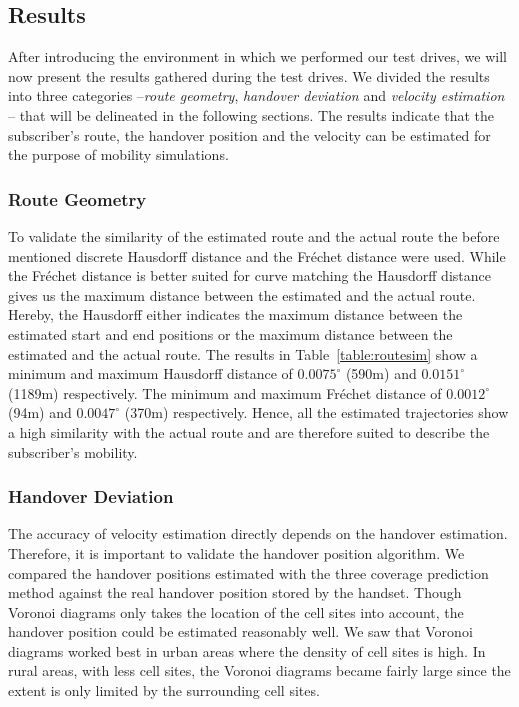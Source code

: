 \subsection{Results}
After introducing the environment in which we performed our test drives, we will now present the results gathered during the test drives. We divided the results into three categories --\emph{route geometry}, \emph{handover deviation} and \emph{velocity estimation} -- that will be delineated in the following sections. The results indicate that the subscriber's route, the handover position and the velocity can be estimated for the purpose of mobility simulations.
\subsubsection{Route Geometry}
To validate the similarity of the estimated route and the actual route the before mentioned discrete Hausdorff distance and the Fr\'{e}chet distance were used. While the Fr\'{e}chet distance is better suited for curve matching the Hausdorff distance gives us the maximum distance between the estimated and the actual route. Hereby, the Hausdorff either indicates the maximum distance between the estimated start and end positions or the maximum distance between the estimated and the actual route. The results in Table~\ref{table:routesim} show a minimum and maximum Hausdorff distance of $0.0075^\circ$ (590m) and $0.0151^\circ$ (1189m) respectively. The minimum and maximum Fr\'{e}chet distance of $0.0012^\circ$ (94m) and $0.0047^\circ$ (370m) respectively. Hence, all the estimated trajectories show a high similarity with the actual route and are therefore suited to describe the subscriber's mobility.
\subsubsection{Handover Deviation}
The accuracy of velocity estimation directly depends on the handover estimation. Therefore, it is important to validate the handover position algorithm. We compared the handover positions estimated with the three coverage prediction method against the real handover position stored by the handset. Though Voronoi diagrams only takes the location of the cell sites into account, the handover position could be estimated reasonably well. We saw that Voronoi diagrams worked best in urban areas where the density of cell sites is high. In rural areas, with less cell sites, the Voronoi diagrams became fairly large since the extent is only limited by the surrounding cell sites. 

